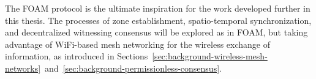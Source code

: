 The FOAM protocol is the ultimate inspiration for the work developed further in this thesis. The processes of zone establishment, spatio-temporal synchronization, and decentralized witnessing consensus will be explored as in FOAM, but taking advantage of WiFi-based mesh networking for the wireless exchange of information, as introduced in Sections~\ref{sec:background-wireless-mesh-networks}~and~\ref{sec:background-permissionless-consensus}.
